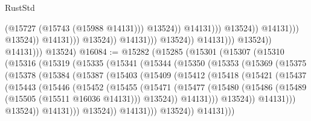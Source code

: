 \begin{lexlean}{RustStd}
\begin{coremodule}
                                                                  (@15727 (@15743 (@15988 @14131)))
                                                                  @13524))
                                                              @14131)))
                                                        @13524))
                                                    @14131)))
                                              @13524))
                                          @14131)))
                                    @13524))
                                @14131)))
                          @13524))
                      @14131)))
                @13524))
            @14131)))
      @13524)
@16084 := @15282
    (@15285
      (@15301
        (@15307
          (@15310
            (@15316
              (@15319
                (@15335
                  (@15341
                    (@15344
                      (@15350
                        (@15353
                          (@15369
                            (@15375
                              (@15378
                                (@15384
                                  (@15387
                                    (@15403
                                      (@15409
                                        (@15412
                                          (@15418
                                            (@15421
                                              (@15437
                                                (@15443
                                                  (@15446
                                                    (@15452
                                                      (@15455
                                                        (@15471
                                                          (@15477
                                                            (@15480
                                                              (@15486
                                                                (@15489
                                                                  (@15505 (@15511 @16036 @14131)))
                                                                @13524))
                                                            @14131)))
                                                      @13524))
                                                  @14131)))
                                            @13524))
                                        @14131)))
                                  @13524))
                              @14131)))
                        @13524))
                    @14131)))

\end{coremodule}
\end{lexlean}
